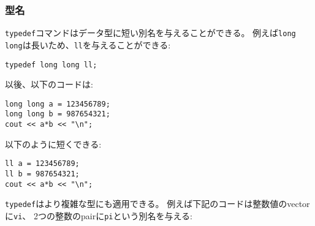 \begin{comment}
\subsubsection{Type names}
\index{tuppdef@\texttt{typedef}}
Using the command \texttt{typedef}
it is possible to give a shorter name
to a datatype.
For example, the name \texttt{long long} is long,
so we can define a shorter name \texttt{ll}:
\begin{lstlisting}
typedef long long ll;
\end{lstlisting}
After this, the code
\begin{lstlisting}
long long a = 123456789;
long long b = 987654321;
cout << a*b << "\n";
\end{lstlisting}
can be shortened as follows:
\begin{lstlisting}
ll a = 123456789;
ll b = 987654321;
cout << a*b << "\n";
\end{lstlisting}
\end{comment}

\subsubsection{型名}

\texttt{typedef}コマンドはデータ型に短い別名を与えることができる。
例えば\texttt{long long}は長いため、\texttt{ll}を与えることができる:
\begin{lstlisting}
typedef long long ll;
\end{lstlisting}

以後、以下のコードは:
\begin{lstlisting}
long long a = 123456789;
long long b = 987654321;
cout << a*b << "\n";
\end{lstlisting}

以下のように短くできる:
\begin{lstlisting}
ll a = 123456789;
ll b = 987654321;
cout << a*b << "\n";
\end{lstlisting}

\begin{comment}
The command \texttt{typedef}
can also be used with more complex types.
For example, the following code gives
the name \texttt{vi} for a vector of integers
and the name \texttt{pi} for a pair
that contains two integers.
\end{comment}

\texttt{typedef}はより複雑な型にも適用できる。
例えば下記のコードは整数値のvectorに\texttt{vi}、
2つの整数のpairに\texttt{pi}という別名を与える:

